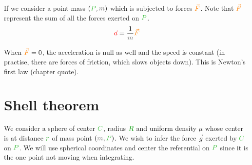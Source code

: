 If we consider a point-mass $(\posit{P}, \mass{m})$ which is subjected
to forces $\textcolor{orange}{\vec F}$. Note that $\textcolor{orange}{\vec F}$ represent the
sum of all the forces exerted on $\posit{P}$.
\[
\accel{\vec a} = \frac 1 {\mass{m}} \force{\vec F}
\]

\begin{remark}
When $\textcolor{orange}{\vec F} = 0$, the acceleration is null as well and the
speed is constant (in practise, there are forces of friction, which
slows objects down). This is Newton's first law (chapter quote).
\end{remark}



\section{Shell theorem}

We consider a sphere of center $\posit{C}$, radius $\dist{R}$ and uniform
density $\mu$ whose center is at distance $\dist{r}$ of mass point
$(\mass{m},\posit{P})$. We wish to infer the force $\vec g$ exerted
by $\posit{C}$ on $\posit{P}$. We will use spherical coordinates and
center the referential on $\posit{P}$ since it is the one point not
moving when integrating.

\begin{figure}[H]
	\centering
\end{figure}

